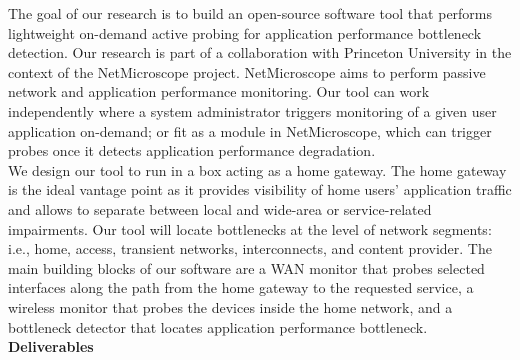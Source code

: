\documentclass[11 pt]{article}
\begin{document}
The goal of our research is to build an open-source software tool that performs lightweight on-demand active probing for application performance bottleneck detection. Our research is part of a collaboration with Princeton University in the context of the NetMicroscope project. NetMicroscope aims to perform passive network and application performance monitoring. Our tool can work independently where a system administrator triggers monitoring of a given user application on-demand; or fit as a module in NetMicroscope, which can trigger probes once it detects application performance degradation.\\

We design our tool to run in a box acting as a home gateway. The home gateway is the ideal vantage point as it provides visibility of home users' application traffic and allows to separate between local and wide-area or service-related impairments. Our tool will locate bottlenecks at the level of network segments: i.e., home, access, transient networks, interconnects, and content provider. The main building blocks of our software are a WAN monitor that probes selected interfaces along the path from the home gateway to the requested service, a wireless monitor that probes the devices inside the home network, and a bottleneck detector that locates application performance bottleneck.\\

\textbf{Deliverables}
\end{document}
